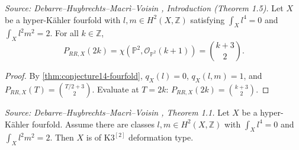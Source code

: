 \begin{theorem}
  \label{thm:hrr-formula-fourfold}
  \textit{Source: Debarre--Huybrechts--Macr\`i--Voisin \cite{MR4654610}, Introduction (Theorem 1.5).}
  Let \(X\) be a hyper-K\"ahler fourfold with \(l, m \in H^2(X, \mathbb{Z})\) satisfying
  \(\int_X l^4 = 0\) and \(\int_X l^2 m^2 = 2\).  For all \(k \in \mathbb{Z}\),
  \[
    P_{RR,X}(2k) = \chi(\mathbb{P}^2, \mathcal{O}_{\mathbb{P}^2}(k+1)) = \binom{k+3}{2}.
  \]
\end{theorem}

\begin{proof}
  By \cref{thm:conjecture14-fourfold}, \(q_X(l) = 0\), \(q_X(l,m) = 1\), and
  \(P_{RR,X}(T) = \binom{T/2 + 3}{2}\).  Evaluate at \(T = 2k\):
  \(P_{RR,X}(2k) = \binom{k + 3}{2}\).
\end{proof}

\begin{theorem}[Fourfolds with \(\int l^2 m^2 = 2\) are of \(\mathrm{K3}^{[2]}\) type]
  \label{thm:k3-deformation-type}
  \textit{Source: Debarre--Huybrechts--Macr\`i--Voisin \cite{MR4654610}, Theorem 1.1.}
  Let \(X\) be a hyper-K\"ahler fourfold.  Assume there are classes
  \(l, m \in H^2(X, \mathbb{Z})\) with \(\int_X l^4 = 0\) and \(\int_X l^2 m^2 = 2\).
  Then \(X\) is of \(\mathrm{K3}^{[2]}\) deformation type.
\end{theorem}


